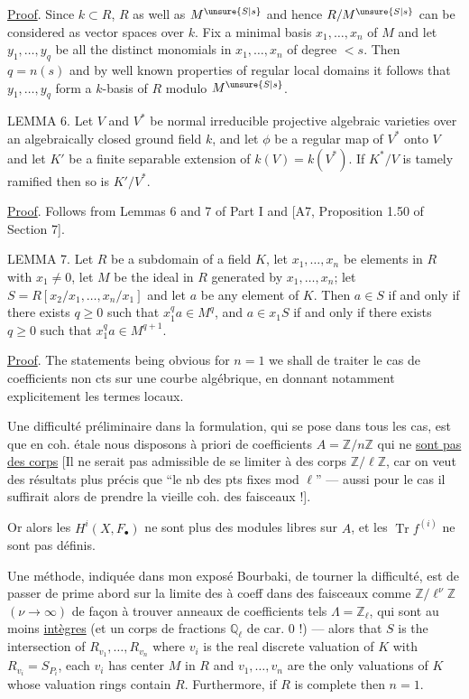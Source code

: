 \uline{Proof}. Since $k\subset R$, $R$ as well as $M^{\unsure{S|s}}$ and hence $R/M^{\unsure{S|s}}$ can be considered as vector spaces over $k$. Fix a minimal basis $x_1,\ldots,x_n$ of $M$ and let $y_1,\ldots,y_q$ be all the distinct monomials in $x_1,\ldots,x_n$ of degree $<s$. Then $q=n(s)$ and by well known properties of regular local domains it follows that $y_1,\ldots,y_q$ form a $k$-basis of $R$ modulo $M^{\unsure{S|s}}$.

LEMMA 6. Let $V$ and $V^*$ be normal irreducible projective algebraic varieties over an algebraically closed ground field $k$, and let $\phi$ be a regular  map of $V^*$ onto $V$ and let $K'$ be a finite separable extension of $k(V)=k(V^*)$. If $K^*/V$ is tamely ramified then so is $K'/V^*$.

\uline{Proof}. Follows from Lemmas 6 and 7 of Part I and [A7, Proposition 1.50 of Section 7].

LEMMA 7. Let $R$ be a subdomain of a field $K$, let $x_1,\ldots,x_n$ be elements in $R$ with $x_1\ne0$, let $M$ be the ideal in $R$ generated by $x_1,\ldots,x_n$; let $S=R[x_2/x_1,\ldots,x_n/x_1]$ and let $a$ be any element of $K$. Then $a\in S$ if and only if there exists $q\geq0$ such that $x_1^qa\in M^q$, and $a\in x_1S$ if and only if there exists $q\geq0$ such that $x_1^qa\in M^{q+1}$.

\uline{Proof}. The statements being obvious for $n=1$ we shall
de traiter le cas  de coefficients non cts sur une courbe algébrique, en donnant notamment explicitement les termes locaux.

Une  difficulté  préliminaire dans la formulation, qui se pose dans tous les cas, est que en coh. étale nous disposons à priori de coefficients $A=\mathbb Z/n\mathbb Z$  qui ne \uline{sont pas des corps} [Il ne serait pas admissible de se limiter à des corps  $\mathbb Z/\ell\mathbb Z$, car on veut des résultats plus précis que ``le nb des pts fixes mod $\ell$'' --- aussi pour le cas il suffirait alors de prendre la vieille coh. des faisceaux  !].

Or alors les $H^i(X,F_\bullet)$ ne sont plus des modules libres sur $A$, et les $\operatorname{Tr}f^{(i)}$ ne sont pas définis.

Une méthode, indiquée dans mon exposé Bourbaki, de tourner la difficulté, est de passer de prime abord sur la limite  des  à coeff dans des faisceaux comme $\mathbb Z/\ell^\nu\mathbb Z$ $(\nu\longrightarrow\infty)$ de façon à trouver    anneaux de coefficients tels $\Lambda=\mathbb Z_\ell$,  qui sont au moins \uline{intègres} (et  un corps de fractions $\mathbb Q_\ell$ de car. $0$ !) --- alors
that $S$ is the intersection of $R_{v_1},\ldots,R_{v_n}$ where $v_i$ is the real discrete valuation of $K$ with $R_{v_i}=S_{P_i}$, each $v_i$ has center $M$ in $R$ and $v_1,\ldots,v_n$ are the only valuations of $K$ whose valuation rings contain $R$. Furthermore, if $R$ is complete then $n=1$.

